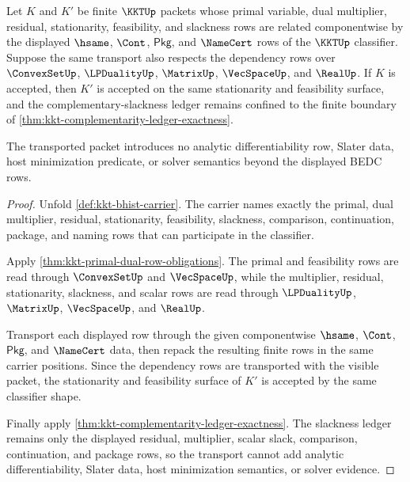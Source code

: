 \begin{theorem}
\label{thm:kkt-stationarity-feasibility-hsame-transport}
Let $K$ and $K'$ be finite $\KKTUp$ packets whose primal variable, dual
multiplier, residual, stationarity, feasibility, and slackness rows are related
componentwise by the displayed $\hsame$, $\Cont$, $\mathsf{Pkg}$, and
$\NameCert$ rows of the $\KKTUp$ classifier. Suppose the same transport also
respects the dependency rows over $\ConvexSetUp$, $\LPDualityUp$, $\MatrixUp$,
$\VecSpaceUp$, and $\RealUp$. If $K$ is accepted, then $K'$ is accepted on the
same stationarity and feasibility surface, and the complementary-slackness
ledger remains confined to the finite boundary of
\autoref{thm:kkt-complementarity-ledger-exactness}.

The transported packet introduces no analytic differentiability row, Slater
data, host minimization predicate, or solver semantics beyond the displayed
BEDC rows.
\end{theorem}
\begin{proof}
Unfold \autoref{def:kkt-bhist-carrier}. The carrier names exactly the primal,
dual multiplier, residual, stationarity, feasibility, slackness, comparison,
continuation, package, and naming rows that can participate in the classifier.

Apply \autoref{thm:kkt-primal-dual-row-obligations}. The primal and feasibility
rows are read through $\ConvexSetUp$ and $\VecSpaceUp$, while the multiplier,
residual, stationarity, slackness, and scalar rows are read through
$\LPDualityUp$, $\MatrixUp$, $\VecSpaceUp$, and $\RealUp$.

Transport each displayed row through the given componentwise $\hsame$,
$\Cont$, $\mathsf{Pkg}$, and $\NameCert$ data, then repack the resulting finite
rows in the same carrier positions. Since the dependency rows are transported
with the visible packet, the stationarity and feasibility surface of $K'$ is
accepted by the same classifier shape.

Finally apply \autoref{thm:kkt-complementarity-ledger-exactness}. The slackness
ledger remains only the displayed residual, multiplier, scalar slack,
comparison, continuation, and package rows, so the transport cannot add
analytic differentiability, Slater data, host minimization semantics, or solver
evidence.
\end{proof}

